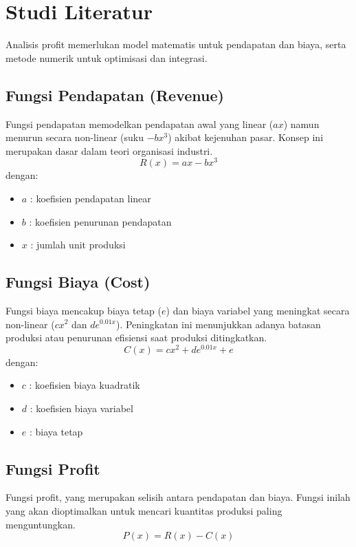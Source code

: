 \documentclass[conference]{IEEEtran}
\begin{document}
\section{Studi Literatur}
Analisis profit memerlukan model matematis untuk pendapatan dan biaya, serta metode numerik untuk optimisasi dan integrasi.

\subsection{Fungsi Pendapatan (Revenue)}
Fungsi pendapatan memodelkan pendapatan awal yang linear ($ax$) namun menurun secara non-linear (suku $-bx^3$) akibat kejenuhan pasar. Konsep ini merupakan dasar dalam teori organisasi industri.
\begin{equation}
R(x) = ax - bx^3
\label{eq:revenue}
\end{equation}
dengan:
\begin{itemize}
    \item $a$ : koefisien pendapatan linear
    \item $b$ : koefisien penurunan pendapatan
    \item $x$ : jumlah unit produksi
\end{itemize}

\subsection{Fungsi Biaya (Cost)}
Fungsi biaya mencakup biaya tetap ($e$) dan biaya variabel yang meningkat secara non-linear ($cx^2$ dan $de^{0.01x}$). Peningkatan ini menunjukkan adanya batasan produksi atau penurunan efisiensi saat produksi ditingkatkan.
\begin{equation}
C(x) = cx^2 + de^{0.01x} + e
\label{eq:cost}
\end{equation}
dengan:
\begin{itemize}
    \item $c$ : koefisien biaya kuadratik
    \item $d$ : koefisien biaya variabel
    \item $e$ : biaya tetap
\end{itemize}

\subsection{Fungsi Profit}
Fungsi profit, yang merupakan selisih antara pendapatan dan biaya. Fungsi inilah yang akan dioptimalkan untuk mencari kuantitas produksi paling menguntungkan.
\begin{equation}
P(x) = R(x) - C(x)
\end{equation}
\end{document}
